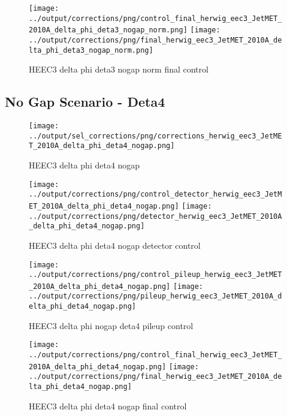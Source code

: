 \documentclass[11pt]{book}
\begin{document}
\begin{figure}[ht]
\centering
\texttt{[image: ../output/corrections/png/control\_final\_herwig\_eec3\_JetMET\_2010A\_delta\_phi\_deta3\_nogap\_norm.png]}
\texttt{[image: ../output/corrections/png/final\_herwig\_eec3\_JetMET\_2010A\_delta\_phi\_deta3\_nogap\_norm.png]}
\caption{HEEC3 delta phi deta3 nogap norm final control}
\label{fig:HEEC3_JetMET_2010A_delta_phi_deta3_nogap_norm_final_control}
\end{figure}




\clearpage
\subsection{No Gap Scenario - Deta4}

\begin{figure}[ht]
\centering
\texttt{[image: ../output/sel\_corrections/png/corrections\_herwig\_eec3\_JetMET\_2010A\_delta\_phi\_deta4\_nogap.png]}
\caption{HEEC3 delta phi deta4 nogap}
\label{fig:HEEC3_JetMET_2010A_delta_phi_deta4_nogap}
\end{figure}

\begin{figure}[ht]
\centering
\texttt{[image: ../output/corrections/png/control\_detector\_herwig\_eec3\_JetMET\_2010A\_delta\_phi\_deta4\_nogap.png]}
\texttt{[image: ../output/corrections/png/detector\_herwig\_eec3\_JetMET\_2010A\_delta\_phi\_deta4\_nogap.png]}
\caption{HEEC3 delta phi deta4 nogap detector control}
\label{fig:HEEC3_JetMET_2010A_delta_phi_deta4_nogap_detector_control}
\end{figure}

\begin{figure}[ht]
\centering
\texttt{[image: ../output/corrections/png/control\_pileup\_herwig\_eec3\_JetMET\_2010A\_delta\_phi\_deta4\_nogap.png]}
\texttt{[image: ../output/corrections/png/pileup\_herwig\_eec3\_JetMET\_2010A\_delta\_phi\_deta4\_nogap.png]}
\caption{HEEC3 delta phi nogap deta4 pileup control}
\label{fig:HEEC3_JetMET_2010A_delta_phi_deta4_nogap_pileup_control}
\end{figure}


\begin{figure}[ht]
\centering
\texttt{[image: ../output/corrections/png/control\_final\_herwig\_eec3\_JetMET\_2010A\_delta\_phi\_deta4\_nogap.png]}
\texttt{[image: ../output/corrections/png/final\_herwig\_eec3\_JetMET\_2010A\_delta\_phi\_deta4\_nogap.png]}
\caption{HEEC3 delta phi deta4 nogap final control}
\label{fig:HEEC3_JetMET_2010A_delta_phi_deta4_nogap_final_control}
\end{figure}
\end{document}
